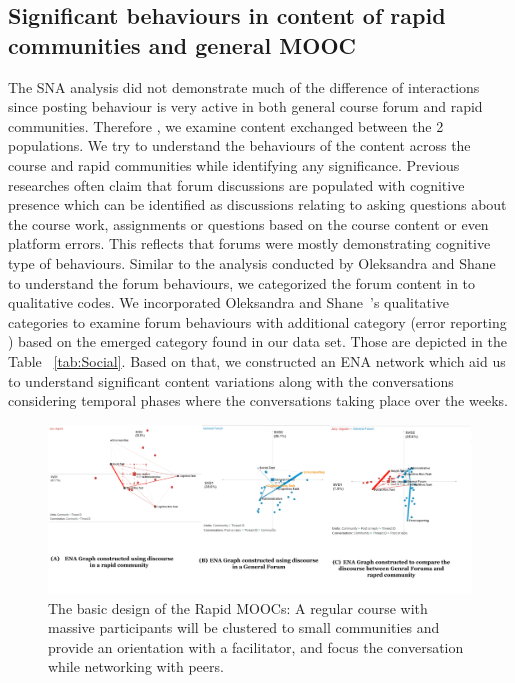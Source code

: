 \documentclass[manuscript,screen,review]{acmart}
\begin{document}
\subsection{Significant behaviours in content of rapid communities and general MOOC}

The SNA analysis did not demonstrate much of the difference of interactions since posting behaviour is very active in both general course forum and rapid communities. Therefore , we examine content exchanged between the 2 populations. We try to understand the behaviours of the content across the course and rapid communities while identifying any significance. Previous researches often claim that forum discussions are populated with cognitive presence which can be identified as discussions relating to asking questions about the course work, assignments or questions based on the course content or even platform errors. This reflects that forums were mostly demonstrating cognitive type of behaviours. Similar to the analysis conducted by Oleksandra and Shane~\cite{oleksandra2016untangling} to understand the forum behaviours, we categorized the forum content in to qualitative codes. We incorporated  Oleksandra and Shane~\cite{oleksandra2016untangling}'s qualitative categories to examine forum behaviours with additional category (error reporting ) based on the emerged category found in our data set. Those are depicted in the Table ~\ref{tab:Social}. Based on that, we constructed an ENA network which aid us to understand significant content variations along with the conversations considering temporal phases where the conversations taking place over the weeks. 

\begin{figure}[h]
  \centering
  \includegraphics[width=\linewidth]{images/ENA Diagrams.png}
  \caption{The basic design of the Rapid MOOCs: A regular course with massive participants will be clustered to small communities and provide an orientation with a facilitator, and focus the conversation while networking with peers.}
 \label{fig:ENADiagrams}
\end{figure}
\end{document}
